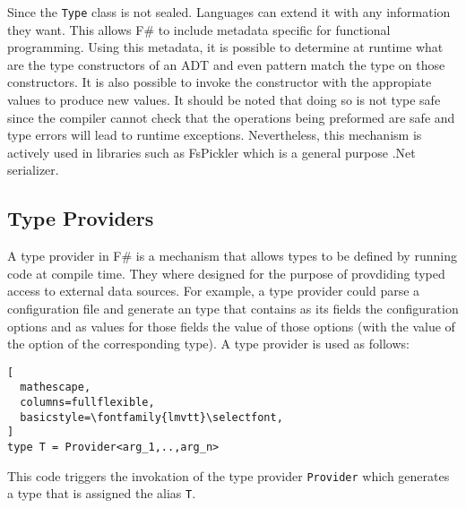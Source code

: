 \documentclass{sigplanconf}
\begin{document}
Since the \verb+Type+ class is not sealed. Languages can extend it
with any information they want. This allows F\# to include metadata
specific for functional programming. Using this metadata, it is
possible to determine at runtime what are the type constructors of an
ADT and even pattern match the type on those constructors. It is also
possible to invoke the constructor with the appropiate values to
produce new values. It should be noted that doing so is not type safe
since the compiler cannot check that the operations being preformed
are safe and type errors will lead to runtime
exceptions. Nevertheless, this mechanism is actively used in libraries
such as FsPickler \cite{FsPickler} which is a general purpose .Net
serializer.

\subsection{Type Providers}
A type provider\cite{typeProviders} in F\# is a mechanism that allows
types to be defined by running code at compile time. They where
designed for the purpose of provdiding typed access to external data
sources. For example, a type provider could parse a configuration file
and generate an type that contains as its fields the configuration
options and as values for those fields the value of those options
(with the value of the option of the corresponding type). A type
provider is used as follows:
\begin{lstlisting}[
  mathescape,
  columns=fullflexible,
  basicstyle=\fontfamily{lmvtt}\selectfont,
]
type T = Provider<arg_1,..,arg_n>
\end{lstlisting}
This code triggers the invokation of the type provider \verb+Provider+
which generates a type that is assigned the alias \verb+T+.
\end{document}
